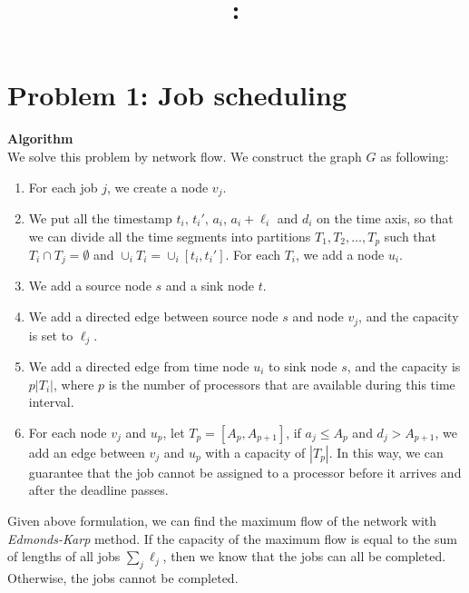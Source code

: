 \documentclass{article}
\title{\textmd{\bf \Class: \Title}}
\date{}
\author{\textbf{\StudentName}}
\newcommand{\Algorithm}{\textbf{Algorithm} \\}
\begin{document}
\maketitle \thispagestyle{empty}
\section*{Problem 1: Job scheduling}
\Algorithm
We solve this problem by network flow. We construct the graph $G$ as following:
\begin{enumerate}
  \item  For each job $j$, we create a node $v_j$. 
  \item We put all the timestamp $t_i$, $t_i'$, $a_i$, $a_i + \ell_i$ and $d_i$ on the time axis, so that we can
    divide all the time segments into partitions $T_1, T_2, \dots, T_p$ such that  $T_i \cap T_j = \emptyset$ 
    and $\cup_{i} T_i = \cup_i [t_i, t_i']$. For each $T_i$, we add a node $u_i$. 
  
  \item  We add a source node $s$ and a sink node $t$. 
  \item We add a directed edge between source node $s$ and node $v_j$, and the capacity is set to
    $\ell_j$.
  \item We add a directed edge from time node $u_i$ to sink node $s$, and the capacity is $p|T_i|$,
    where $p$ is the number of processors that are available during this time interval.

  \item For each node $v_j$ and $u_p$, let $T_p= [A_p, A_{p+1}]$, if $a_j \leq A_{p}$ and $d_j >
    A_{p+1}$, 
    we add an edge between $v_j$
    and $u_p$ with a capacity of $|T_p|$. In this way, we can guarantee that the job cannot be assigned
    to a processor before it arrives and after the deadline passes.

\end{enumerate}

Given above formulation, we can find the maximum flow of the network with \textit{Edmonds-Karp}
method. If the capacity of the maximum
flow is equal to the sum of lengths of all jobs $\sum_{j} \ell_j$, then we know that the jobs can
all be completed. Otherwise, the jobs cannot be completed. 
\end{document}
